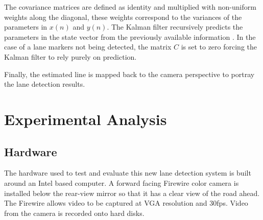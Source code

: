 \documentclass{article}
\begin{document}
The covariance matrices are defined as identity and multiplied with non-uniform weights along the diagonal, these weights correspond to the variances of the parameters in $x(n)$ and $y(n)$. The Kalman filter recursively predicts the parameters in the state vector from the previously available information \cite{hayes_statistical_1996,brookner_tracking_1998}.
In the case of a lane markers not being detected, the matrix $C$ is set to zero
forcing the Kalman filter to rely purely on prediction.

Finally, the estimated line is mapped back to the camera perspective to portray the lane detection results.

\section{Experimental Analysis}
\label{sec:exp_ana}
\subsection{Hardware}
The hardware used to test and evaluate this new lane detection system is built around an Intel based computer.  A forward facing Firewire color camera is installed below the rear-view mirror so that it has a clear view of the road ahead. The Firewire allows video to be captured at VGA resolution and 30fps.
Video from the camera is recorded onto hard disks.
\end{document}
